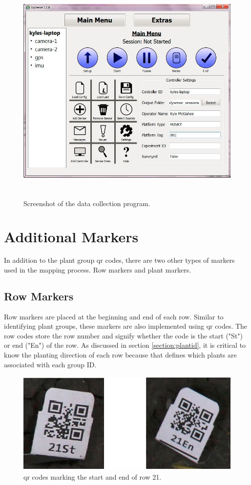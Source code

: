 \begin{figure}
	\centering
    \includegraphics[height=4.5in]{figures/dysense2.jpg}
    \caption[Data collection program]{Screenshot of the data collection program.}
    \label{dysense_screenshot}
\end{figure}

\section{Additional Markers}
\label{system-markers}

In addition to the plant group \ac{qr} codes, there are two other types of markers used in the mapping process. Row markers and plant markers.   

\subsection{Row Markers}

Row markers are placed at the beginning and end of each row. Similar to identifying plant groups, these markers are also implemented using \ac{qr} codes.  The row codes store the row number and signify whether the code is the start ("St") or end ("En") of the row. As discussed in section \ref{section:plantid}, it is critical to know the planting direction of each row because that defines which plants are associated with each group ID.

\begin{figure}
	\centering
    \includegraphics[height=2in]{figures/row_codes.jpg}
    \caption[Row QR codes]{\ac{qr} codes marking the start and end of row 21.}
    \label{figure:row_codes}
\end{figure}

